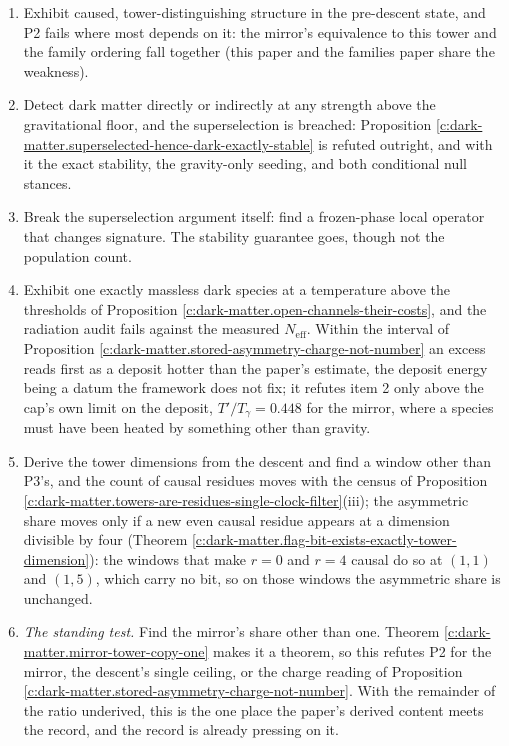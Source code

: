 \documentclass[11pt]{article}
\theoremstyle{definition}
\theoremstyle{plain}
\providecommand{\Neff}{}\renewcommand{\Neff}{N_{\mathrm{eff}}}
\begin{document}
\begin{enumerate}
\item Exhibit caused, tower-distinguishing structure in the pre-descent state, and P2 fails where most depends on it: the mirror's equivalence to this tower and the family ordering fall together (this paper and the families paper share the weakness).
\item Detect dark matter directly or indirectly at any strength above the gravitational floor, and the superselection is breached: Proposition \ref{c:dark-matter.superselected-hence-dark-exactly-stable} is refuted outright, and with it the exact stability, the gravity-only seeding, and both conditional null stances.
\item Break the superselection argument itself: find a frozen-phase local operator that changes signature. The stability guarantee goes, though not the population count.
\item Exhibit one exactly massless dark species at a temperature above the thresholds of Proposition \ref{c:dark-matter.open-channels-their-costs}, and the radiation audit fails against the measured $\Neff$. Within the interval of Proposition \ref{c:dark-matter.stored-asymmetry-charge-not-number} an excess reads first as a deposit hotter than the paper's estimate, the deposit energy being a datum the framework does not fix; it refutes item 2 only above the cap's own limit on the deposit, $T'/T_{\gamma} = 0.448$ for the mirror, where a species must have been heated by something other than gravity.
\item Derive the tower dimensions from the descent and find a window other than P3's, and the count of causal residues moves with the census of Proposition \ref{c:dark-matter.towers-are-residues-single-clock-filter}(iii); the asymmetric share moves only if a new even causal residue appears at a dimension divisible by four (Theorem \ref{c:dark-matter.flag-bit-exists-exactly-tower-dimension}): the windows that make $r = 0$ and $r = 4$ causal do so at $(1,1)$ and $(1,5)$, which carry no bit, so on those windows the asymmetric share is unchanged.
\item \emph{The standing test.} Find the mirror's share other than one. Theorem \ref{c:dark-matter.mirror-tower-copy-one} makes it a theorem, so this refutes P2 for the mirror, the descent's single ceiling, or the charge reading of Proposition \ref{c:dark-matter.stored-asymmetry-charge-not-number}. With the remainder of the ratio underived, this is the one place the paper's derived content meets the record, and the record is already pressing on it.


\end{enumerate}
\end{document}
